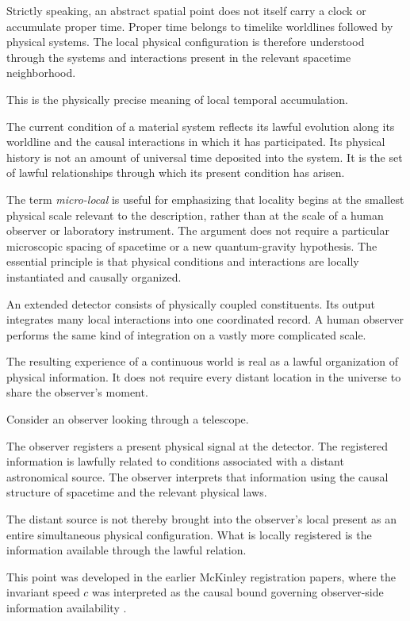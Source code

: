 \documentclass[12pt,onecolumn]{article}
\begin{document}
Strictly speaking, an abstract spatial point does not itself carry a clock or accumulate proper time. Proper time belongs to timelike worldlines followed by physical systems. The local physical configuration is therefore understood through the systems and interactions present in the relevant spacetime neighborhood.

This is the physically precise meaning of local temporal accumulation.

The current condition of a material system reflects its lawful evolution along its worldline and the causal interactions in which it has participated. Its physical history is not an amount of universal time deposited into the system. It is the set of lawful relationships through which its present condition has arisen.

The term \emph{micro-local} is useful for emphasizing that locality begins at the smallest physical scale relevant to the description, rather than at the scale of a human observer or laboratory instrument. The argument does not require a particular microscopic spacing of spacetime or a new quantum-gravity hypothesis. The essential principle is that physical conditions and interactions are locally instantiated and causally organized.

An extended detector consists of physically coupled constituents. Its output integrates many local interactions into one coordinated record. A human observer performs the same kind of integration on a vastly more complicated scale.

The resulting experience of a continuous world is real as a lawful organization of physical information. It does not require every distant location in the universe to share the observer's moment.

Consider an observer looking through a telescope.

The observer registers a present physical signal at the detector. The registered information is lawfully related to conditions associated with a distant astronomical source. The observer interprets that information using the causal structure of spacetime and the relevant physical laws.

The distant source is not thereby brought into the observer's local present as an entire simultaneous physical configuration. What is locally registered is the information available through the lawful relation.

This point was developed in the earlier McKinley registration papers, where the invariant speed \(c\) was interpreted as the causal bound governing observer-side information availability \cite{RegistrationBound}.
\end{document}
